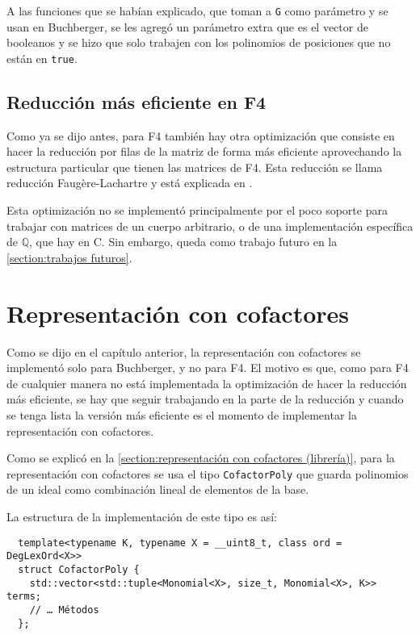\documentclass[12pt]{report}
\theoremstyle{customstyle}
\theoremstyle{factstyle}
\newcommand\cpp{C\nolinebreak[4]\hspace{-.05em}\raisebox{.4ex}{\relsize{-3}{\textbf{++}}}\xspace}
\begin{document}
A las funciones que se habían explicado, que toman a \texttt{G} como parámetro y se usan en Buchberger, se les agregó un parámetro extra que es el vector de booleanos y se hizo que solo trabajen con los polinomios de posiciones que no están en \texttt{true}.

\subsection{Reducción más eficiente en F4}\label{subsection:Reducción más eficiente en F4}

Como ya se dijo antes, para F4 también hay otra optimización que consiste en hacer la reducción por filas de la matriz de forma más eficiente aprovechando la estructura particular que tienen las matrices de F4. Esta reducción se llama reducción Faugère-Lachartre y está explicada en \cite{thesis:Hof20}.

Esta optimización no se implementó principalmente por el poco soporte para trabajar con matrices de un cuerpo arbitrario, o de una implementación específica de $ℚ$, que hay en \cpp. Sin embargo, queda como trabajo futuro en la \cref{section:trabajos futuros}.

\section{Representación con cofactores}

Como se dijo en el capítulo anterior, la representación con cofactores se implementó solo para Buchberger, y no para F4. El motivo es que, como para F4 de cualquier manera no está implementada la optimización de hacer la reducción más eficiente, se hay que seguir trabajando en la parte de la reducción y cuando se tenga lista la versión más eficiente es el momento de implementar la representación con cofactores.

Como se explicó en la \cref{section:representación con cofactores (librería)}, para la representación con cofactores se usa el tipo \texttt{CofactorPoly} que guarda polinomios de un ideal como combinación lineal de elementos de la base.

La estructura de la implementación de este tipo es así:

\begin{verbatim}
  template<typename K, typename X = __uint8_t, class ord = DegLexOrd<X>>
  struct CofactorPoly {
    std::vector<std::tuple<Monomial<X>, size_t, Monomial<X>, K>> terms;
    // … Métodos
  };
\end{verbatim}
\end{document}
